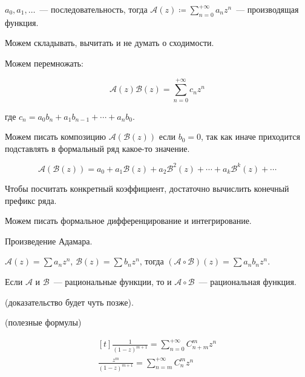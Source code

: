 \begin{definition}
    $a_0, a_1, \ldots$~--- последовательность,
    тогда $\mathscr A(z) \coloneqq \sum\limits_{n=0}^{+\infty} a_nz^n$~---
    производящая функция.
\end{definition}

\begin{observation}
    Можем складывать, вычитать и не думать о сходимости.
\end{observation}

\begin{observation}
    Можем перемножать:

    \[
        \mathscr A(z) \mathscr B(z) = \sum\limits_{n=0}^{+\infty}
        c_nz^n
    \]

    где $c_n = a_0b_n + a_1b_{n-1} + \cdots + a_nb_0$.
\end{observation}

\begin{observation}
    Можем писать композицию $\mathscr A(\mathscr B(z))$
    если $b_0 = 0$, так как иначе
    приходится подставлять в формальный ряд
    какое-то значение.

    \[
        \mathscr A(\mathscr B(z)) = a_0 + a_1 \mathscr B(z) +
        a_2\mathscr B^2(z) + \cdots
        + a_k \mathscr B^k(z) + \cdots
    \]

    Чтобы посчитать конкретный коэффициент, достаточно
    вычислить конечный префикс ряда.
\end{observation}

\begin{observation}
    Можем писать формальное дифференцирование
    и интегрирование.
\end{observation}

\begin{definition}
    Произведение Адамара.

    $\mathscr A(z) = \sum a_nz^n$, $\mathscr B(z) = \sum b_n z^n$,
    тогда $(\mathscr A \circ \mathscr B) (z) = \sum a_nb_nz^n$.
\end{definition}

\begin{theorem}
    Если $\mathscr A$ и $\mathscr B$~--- рациональные функции,
    то и $\mathscr A \circ \mathscr B$~--- рациональная функция.

    (доказательство будет чуть позже).
\end{theorem}

\begin{observation}
    (полезные формулы)

    \[
        \begin{aligned}[t]
            \frac{1}{(1-z)^{m+1}} = \sum\limits_{n=0}^{+\infty} C_{n+m}^m z^n \\
            \frac{z^m}{(1-z)^{m+1}} = \sum\limits_{n=m}^{+\infty} C_n^m z^n   \\
        \end{aligned}
    \]
\end{observation}

